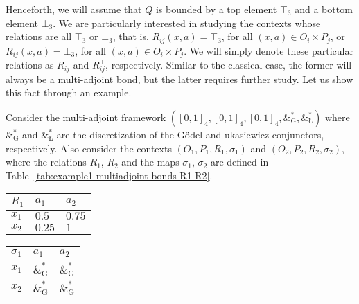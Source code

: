 \documentclass[runningheads,a4paper]{llncs}
\newcommand{\adjoint}{\mathop{\&}\nolimits}
\newcommand{\G}{\text{G}}
\let\oldLcommand\L
\let\L\relax
\def\L{\text{\oldLcommand}}
\newcommand{\cred}[1]{{\color{red} #1}}
\begin{document}
{Henceforth, we will assume that $Q$ is bounded by a top element $\top_3$ and a bottom element $\bot_3$.} We are particularly interested in studying the contexts whose relations are all $\top_3$ or $\bot_3$, that is, $R_{ij}(x, a) = \top_3$, for all $(x, a) \in O_i \times P_j$, or $R_{ij}(x, a) = \bot_3$, for all $(x, a) \in O_i \times P_j$. We will simply denote these particular relations as $R_{ij}^\top$ and $R_{ij}^\bot$, respectively. 
Similar to the classical case, the former will always be a multi-adjoint bond, but the latter requires further study. Let us show this fact through an example.

\begin{example}\label{ex:multiadjoint-bonds}

Consider the multi-adjoint framework $([0, 1]_4, [0, 1]_4, [0, 1]_4, \adjoint^*_\G, \adjoint^*_\L)$ where $\adjoint^*_\G$ and $\adjoint^*_\L$ are the discretization of the G\"{o}del and \L ukasiewicz conjunctors, respectively. Also consider the contexts $(O_1, P_1, R_1, \sigma_1)$ and $(O_2, P_2, R_2, \sigma_2)$, where the relations $R_1$, $R_2$ and the maps $\sigma_1$, $\sigma_2$ are defined in Table~\ref{tab:example1-multiadjoint-bonds-R1-R2}.
\begin{table}[h]
	\centering
	\vspace{-1ex}
	\begin{tabular}{w{c}{20pt} || w{c}{20pt} | w{c}{20pt}}
		$R_1$ & $a_1$ & $a_2$ \\\hline\hline
		$x_1$ & $0.5$ & $0.75$ \\\hline
		$x_2$ & $0.25$ & $1$
	\end{tabular}
    \hfill
	\begin{tabular}{w{c}{20pt} || w{c}{20pt} | w{c}{20pt}}
		$\sigma_1$ & $a_1$ & $a_2$ \\\hline\hline
		$x_1$ & $\adjoint^*_\G$ & $\adjoint^*_\G$ \\\hline
		$x_2$ & $\adjoint^*_\G$ & $\adjoint^*_\G$
	\end{tabular}

\end{table}
\end{example}
\end{document}
